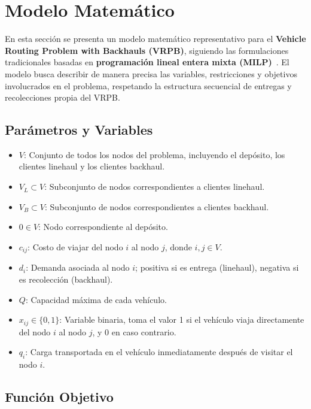 \documentclass[letter, 10pt]{article}
\begin{document}
\section{Modelo Matem\'atico}

En esta secci\'on se presenta un modelo matem\'atico representativo para el \textbf{Vehicle Routing Problem with Backhauls (VRPB)}, siguiendo las formulaciones tradicionales basadas en \textbf{programaci\'on lineal entera mixta (MILP)}~\cite{goetschalckx1989vehicle}. El modelo busca describir de manera precisa las variables, restricciones y objetivos involucrados en el problema, respetando la estructura secuencial de entregas y recolecciones propia del VRPB.

\subsection*{Par\'ametros y Variables}

\begin{itemize}
    \item \( V \): Conjunto de todos los nodos del problema, incluyendo el dep\'osito, los clientes linehaul y los clientes backhaul.
    \item \( V_L \subset V \): Subconjunto de nodos correspondientes a clientes linehaul.
    \item \( V_B \subset V \): Subconjunto de nodos correspondientes a clientes backhaul.
    \item \( 0 \in V \): Nodo correspondiente al dep\'osito.
    \item \( c_{ij} \): Costo de viajar del nodo \( i \) al nodo \( j \), donde \( i, j \in V \).
    \item \( d_i \): Demanda asociada al nodo \( i \); positiva si es entrega (linehaul), negativa si es recolecci\'on (backhaul).
    \item \( Q \): Capacidad m\'axima de cada veh\'iculo.
\end{itemize}

\begin{itemize}
    \item \( x_{ij} \in \{0,1\} \): Variable binaria, toma el valor 1 si el veh\'iculo viaja directamente del nodo \( i \) al nodo \( j \), y 0 en caso contrario.
    \item \( q_i \): Carga transportada en el veh\'iculo inmediatamente despu\'es de visitar el nodo \( i \).
\end{itemize}

\subsection*{Funci\'on Objetivo}
\end{document}

